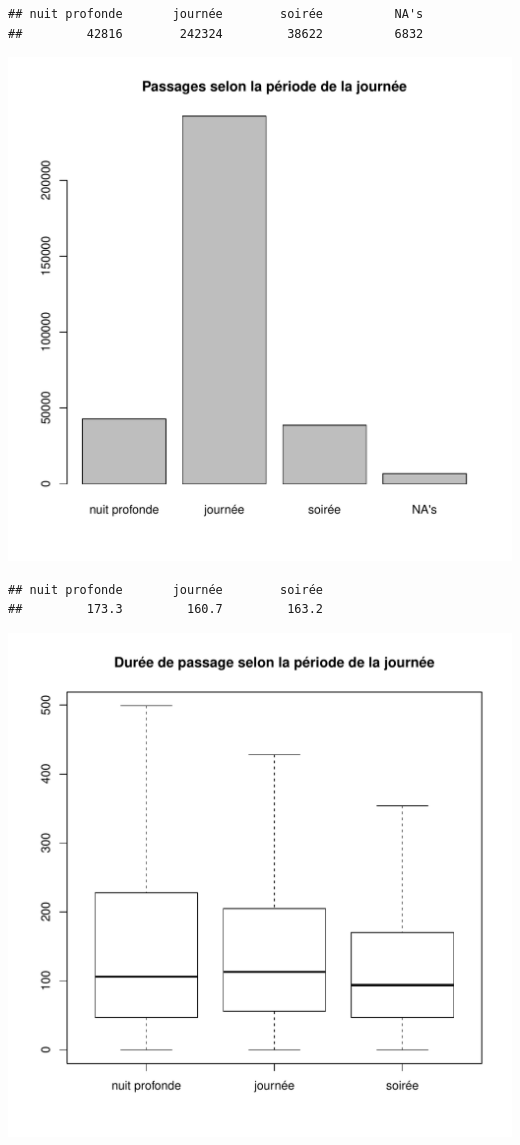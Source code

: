 \documentclass[12pt,english,french,twoside]{report}\usepackage[]{graphicx}\usepackage[]{color}
\makeatletter
\def\maxwidth{ %
  \ifdim\Gin@nat@width>\linewidth
    \linewidth
  \else
    \Gin@nat@width
  \fi
}
\newenvironment{kframe}{%
 \def\at@end@of@kframe{}%
 \ifinner\ifhmode%
  \def\at@end@of@kframe{\end{minipage}}%
  \begin{minipage}{\columnwidth}%
 \fi\fi%
 \def\FrameCommand##1{\hskip\@totalleftmargin \hskip-\fboxsep
 \colorbox{shadecolor}{##1}\hskip-\fboxsep
     \hskip-\linewidth \hskip-\@totalleftmargin \hskip\columnwidth}%
 \MakeFramed {\advance\hsize-\width
   \@totalleftmargin\z@ \linewidth\hsize
   \@setminipage}}%
 {\par\unskip\endMakeFramed%
 \at@end@of@kframe}
\newenvironment{knitrout}{}{} %
\makeatother
\begin{document}
\begin{knitrout}
\color{fgcolor}\begin{kframe}
\begin{verbatim}
## nuit profonde       journée        soirée          NA's 
##         42816        242324         38622          6832
\end{verbatim}
\end{kframe}
\includegraphics[width=\maxwidth]{figure/duree_heure1} 
\begin{kframe}\begin{verbatim}
## nuit profonde       journée        soirée 
##         173.3         160.7         163.2
\end{verbatim}
\end{kframe}
\includegraphics[width=\maxwidth]{figure/duree_heure2} 

\end{knitrout}
\end{document}

